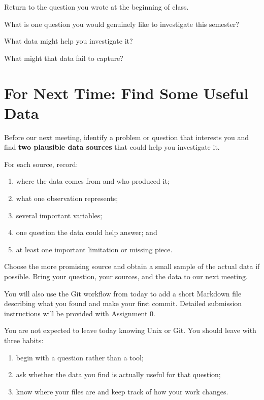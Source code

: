\documentclass[11pt]{article}
\begin{document}
Return to the question you wrote at the beginning of class.

\questionlabel

What is one question you would genuinely like to investigate this semester?

\vspace{0.55in}

\datalabel

What data might help you investigate it?

\vspace{0.55in}

\limitationlabel

What might that data fail to capture?

\vspace{0.55in}

\section{For Next Time: Find Some Useful Data}

Before our next meeting, identify a problem or question that interests you and
find \textbf{two plausible data sources} that could help you investigate it.

For each source, record:

\begin{enumerate}[leftmargin=*]
  \item where the data comes from and who produced it;
  \item what one observation represents;
  \item several important variables;
  \item one question the data could help answer; and
  \item at least one important limitation or missing piece.
\end{enumerate}

Choose the more promising source and obtain a small sample of the actual data
if possible. Bring your question, your sources, and the data to our next
meeting.

You will also use the Git workflow from today to add a short Markdown file
describing what you found and make your first commit. Detailed submission
instructions will be provided with Assignment 0.

\begin{reflection}
You are not expected to leave today knowing Unix or Git. You should leave
with three habits:

\begin{enumerate}[leftmargin=*]
  \item begin with a question rather than a tool;
  \item ask whether the data you find is actually useful for that question;
  \item know where your files are and keep track of how your work changes.
\end{enumerate}
\end{reflection}
\end{document}
